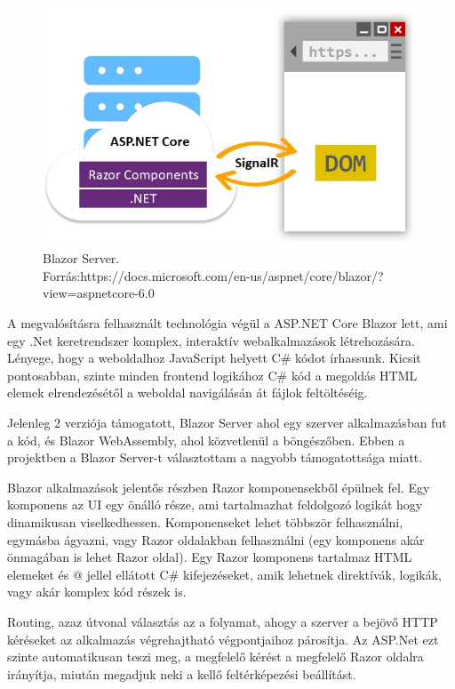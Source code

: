 
\begin{figure}[h]
\centering
\includegraphics[scale=0.5]{images/blazor.jpg}
\caption{Blazor Server. \\ Forrás:https://docs.microsoft.com/en-us/aspnet/core/blazor/?view=aspnetcore-6.0}
\label{fig:blazor}
\end{figure}

A megvalósításra felhasznált technológia végül a ASP.NET Core Blazor lett, ami egy .Net keretrendszer komplex, interaktív webalkalmazások létrehozására. Lényege, hogy a weboldalhoz  JavaScript helyett C\# kódot írhassunk. Kicsit pontosabban, szinte minden frontend logikához C\# kód a megoldás HTML elemek elrendezésétől a weboldal navigálásán át fájlok feltöltéséig.

Jelenleg 2 verziója támogatott, Blazor Server ahol egy szerver alkalmazásban fut a kód, és Blazor WebAssembly, ahol közvetlenül a böngészőben. Ebben a projektben a Blazor Server-t választottam a nagyobb támogatottsága miatt.

Blazor alkalmazások jelentős részben Razor komponensekből épülnek fel. Egy komponens az UI egy önálló része, ami tartalmazhat feldolgozó logikát hogy dinamikusan viselkedhessen. Komponenseket lehet többször felhasználni, egymásba ágyazni, vagy Razor oldalakban felhasználni (egy komponens akár önmagában is lehet Razor oldal). Egy Razor komponens tartalmaz HTML elemeket és @ jellel ellátott C\# kifejezéseket, amik lehetnek direktívák, logikák, vagy akár komplex kód részek is.

Routing, azaz útvonal választás az a folyamat, ahogy a szerver a bejövő HTTP kéréseket az alkalmazás végrehajtható végpontjaihoz párosítja. Az ASP.Net ezt szinte automatikusan teszi meg, a megfelelő kérést a megfelelő Razor oldalra irányítja, miután megadjuk neki a kellő feltérképezési beállítást. 

